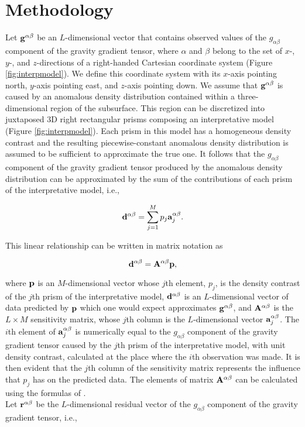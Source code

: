 \section{Methodology}


Let $\mathbf{g}^{\alpha\beta}$ be an $L$-dimensional vector that contains observed
values of the $g_{\alpha\beta}$ component of the gravity gradient tensor, where
$\alpha$ and $\beta$ belong to the set of $x$-, $y$-, and $z$-directions of a
right-handed Cartesian coordinate system (Figure \ref{fig:interpmodel}).
We define this coordinate system with its
$x$-axis pointing north, $y$-axis pointing east, and $z$-axis pointing down.
We assume that $\mathbf{g}^{\alpha\beta}$ is caused by an anomalous density
distribution contained within a three-dimensional region of the subsurface.
This region can be discretized into juxtaposed 3D right rectangular prisms
composing an interpretative model (Figure \ref{fig:interpmodel}).
Each prism in this model has a homogeneous density contrast and the resulting
piecewise-constant anomalous density distribution is assumed to be sufficient to
approximate the true one.
It follows that the $g_{\alpha\beta}$ component of the gravity gradient
tensor produced by the anomalous density distribution can be approximated by
the sum of the contributions of each prism of the interpretative model, i.e.,

\begin{equation}
\mathbf{d}^{\alpha\beta} = \sum\limits_{j=1}^{M} p_j \mathbf{a}_j^{\alpha\beta}.
\label{eq:dalphabeta_sum}
\end{equation}

\noindent
This linear relationship can be written in matrix notation as

\begin{equation}
\mathbf{d}^{\alpha\beta} = \mathbf{A}^{\alpha\beta} \mathbf{p},
\label{eq:dalphabeta_mat}
\end{equation}

\noindent
where $\mathbf{p}$ is an $M$-dimensional vector whose
$j$th element, $p_j$, is the density contrast of the $j$th prism of the
interpretative model, $\mathbf{d}^{\alpha\beta}$ is an
$L$-dimensional vector of data predicted by $\mathbf{p}$
which one would expect approximates $\mathbf{g}^{\alpha\beta}$, and 
$\mathbf{A}^{\alpha\beta}$ is the $L \times M$
sensitivity matrix, whose $j$th column is the
$L$-dimensional vector $\mathbf{a}_j^{\alpha\beta}$. 
The $i$th element of $\mathbf{a}_j^{\alpha\beta}$ is numerically equal to the
$g_{\alpha\beta}$ component of the gravity gradient tensor caused by the $j$th
prism of the interpretative model, with unit density contrast, calculated at
the place where the $i$th observation was made.
It is then evident that the $j$th column of the sensitivity
matrix represents the influence that $p_j$ has on the predicted data. 
The elements of matrix $\mathbf{A}^{\alpha\beta}$ can be calculated using the
formulas of \citet{nagy}.
\\ \indent
Let $\mathbf{r}^{\alpha\beta}$ be the $L$-dimensional residual
vector of the $g_{\alpha\beta}$ component of the gravity gradient tensor, i.e.,

